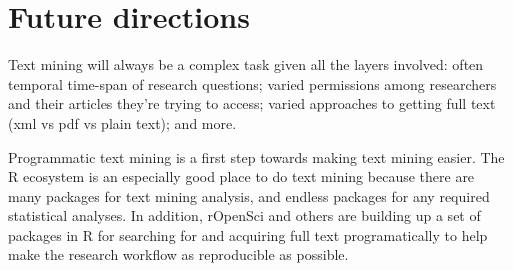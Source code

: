 \documentclass[author-year, review, 11pt]{components/elsarticle} %
\newenvironment{Shaded}{\begin{snugshade}}{\end{snugshade}}
\newcommand{\CommentTok}[1]{\textcolor[rgb]{0.56,0.35,0.01}{\textit{#1}}}
\newcommand{\DataTypeTok}[1]{\textcolor[rgb]{0.13,0.29,0.53}{#1}}
\newcommand{\DecValTok}[1]{\textcolor[rgb]{0.00,0.00,0.81}{#1}}
\newcommand{\KeywordTok}[1]{\textcolor[rgb]{0.13,0.29,0.53}{\textbf{#1}}}
\newcommand{\NormalTok}[1]{#1}
\newcommand{\OperatorTok}[1]{\textcolor[rgb]{0.81,0.36,0.00}{\textbf{#1}}}
\newcommand{\StringTok}[1]{\textcolor[rgb]{0.31,0.60,0.02}{#1}}
\begin{document}
\begin{Shaded}
\end{Shaded}

\hypertarget{future-directions}{%
\section{Future directions}\label{future-directions}}

Text mining will always be a complex task given all the layers involved:
often temporal time-span of research questions; varied permissions among
researchers and their articles they're trying to access; varied
approaches to getting full text (xml vs pdf vs plain text); and more.

Programmatic text mining is a first step towards making text mining
easier. The R ecosystem is an especially good place to do text mining
because there are many packages for text mining analysis, and endless
packages for any required statistical analyses. In addition, rOpenSci
and others are building up a set of packages in R for searching for and
acquiring full text programatically to help make the research workflow
as reproducible as possible.
\end{document}
